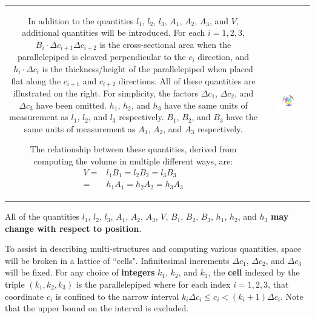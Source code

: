 \documentclass{book}
\begin{document}
\begin{tabular}{cc}
\parbox{0.5\textwidth}{
In addition to the quantities \(l_1\), \(l_2\), \(l_3\), \(A_1\), \(A_2\), \(A_3\), and \(V\), additional quantities will be introduced. For each \(i = 1, 2, 3\), \(B_i \cdot \Delta c_{i+1} \Delta c_{i+2}\) is the cross-sectional area when the parallelepiped is cleaved perpendicular to the \(c_i\) direction, and \(h_i \cdot \Delta c_i\) is the thickness/height of the parallelepiped when placed flat along the \(c_{i+1}\) and \(c_{i+2}\) directions. All of these quantities are illustrated on the right. For simplicity, the factors \(\Delta c_1\), \(\Delta c_2\), and \(\Delta c_3\) have been omitted. \(h_1\), \(h_2\), and \(h_3\) have the same units of measurement as \(l_1\), \(l_2\), and \(l_3\) respectively. \(B_1\), \(B_2\), and \(B_3\) have the same units of measurement as \(A_1\), \(A_2\), and \(A_3\) respectively.  

The relationship between these quantities, derived from computing the volume in multiple different ways, are:
\begin{align*}
V = & l_1 B_1 = l_2 B_2 = l_3 B_3 \\ 
= & h_1 A_1 = h_2 A_2 = h_3 A_3
\end{align*} 
} & \parbox{0.5\textwidth}{
\includegraphics[width = 0.5\textwidth]{Coordinate_systems/coordinate_system}
}
\end{tabular}

All of the quantities \(l_1\), \(l_2\), \(l_3\), \(A_1\), \(A_2\), \(A_3\), \(V\), \(B_1\), \(B_2\), \(B_3\), \(h_1\), \(h_2\), and \(h_3\) {\bf may change with respect to position}.

To assist in describing multi-structures and computing various quantities, space will be broken in a lattice of ``cells". Infinitesimal increments \(\Delta c_1\), \(\Delta c_2\), and \(\Delta c_3\) will be fixed. For any choice of {\bf integers} \(k_1\), \(k_2\), and \(k_3\), the {\bf cell} indexed by the triple \((k_1, k_2, k_3)\) is the parallelepiped where for each index \(i = 1, 2, 3\), that coordinate \(c_i\) is confined to the narrow interval \(k_i \Delta c_i \leq c_i < (k_i + 1)\Delta c_i\). Note that the upper bound on the interval is excluded. 
\end{document}
